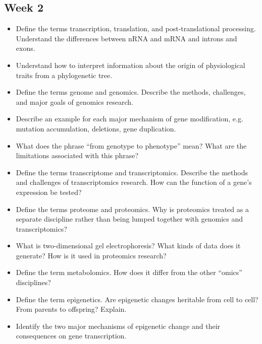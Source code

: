 \documentclass[12pt,a4paper]{article}
\begin{document}
\clearpage
{}
\subsection{Week 2}
\begin{itemize}
    \item Define the terms transcription, translation, and post-translational processing. Understand the differences between nRNA and mRNA and introns and exons. 
    \item Understand how to interpret information about the origin of physiological traits from a phylogenetic tree.
    \item Define the terms genome and genomics. Describe the methods, challenges, and major goals of genomics research.
    \item Describe an example for each major mechanism of gene modification, e.g. mutation accumulation, deletions, gene duplication.
    \item What does the phrase “from genotype to phenotype” mean? What are the limitations associated with this phrase?
    \item Define the terms transcriptome and transcriptomics. Describe the methods and challenges of transcriptomics research. How can the function of a gene’s expression be tested?
    \item Define the terms proteome and proteomics. Why is proteomics treated as a separate discipline rather than being lumped together with genomics and transcriptomics?
    \item What is two-dimensional gel electrophoresis? What kinds of data does it generate? How is it used in proteomics research?
    \item Define the term metabolomics. How does it differ from the other “omics” disciplines?
    \item Define the term epigenetics. Are epigenetic changes heritable from cell  to cell? From parents to offspring? Explain.
    \item Identify the two major mechanisms of epigenetic change and their consequences on gene transcription.
\end{itemize}
\end{document}
